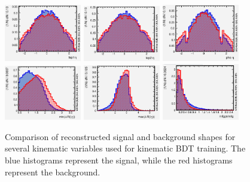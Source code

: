 \begin{figure}[tb]
	\begin{center}
		\includegraphics[width=0.3\textwidth]{fig/MVA/lepeta1_reco.png}
		\includegraphics[width=0.3\textwidth]{fig/MVA/lepeta2_reco.png}
		\includegraphics[width=0.3\textwidth]{fig/MVA/phoeta_reco.png}
		\includegraphics[width=0.3\textwidth]{fig/MVA/mindr_reco.png}
		\includegraphics[width=0.3\textwidth]{fig/MVA/maxdr_reco.png}
		\includegraphics[width=0.3\textwidth]{fig/MVA/pt_over_m_reco.png}
	\end{center}
	\caption{Comparison of reconstructed signal and background shapes for several kinematic variables used for kinematic BDT training. The blue histograms represent the signal, while the red histograms represent the background.}
	\label{fig:kin_training_shapes}
\end{figure}

